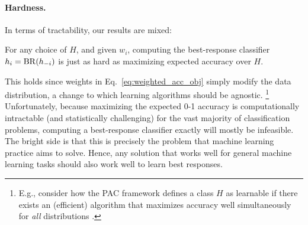 \paragraph{Hardness.}
In terms of 
tractability,
our results are mixed:
\begin{observation}
For any choice of $H$,
and given $w_i$, computing the best-response classifier
$h_i = \mathrm{BR}(h_{-i})$ is just as hard as maximizing expected accuracy over $H$.
\end{observation}
This holds since weights in Eq.~\eqref{eq:weighted_acc_obj} simply modify the data distribution,
a change to which learning algorithms should be agnostic.%
\footnote{E.g., consider how the PAC framework defines a class $H$ as learnable if there exists an (efficient) algorithm that maximizes accuracy well simultaneously for \emph{all} distributions
\citep{valiant1984theory}.}
Unfortunately, because maximizing the expected 0-1 accuracy is computationally intractable (and statistically challenging) for the vast majority of classification problems,
computing a best-response classifier exactly will mostly be infeasible.
The bright side is that this is precisely the problem that machine learning practice aims to solve.
Hence, any solution that works well for general machine learning tasks
should also work well to learn best responses.
\squeeze

